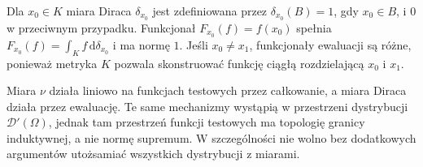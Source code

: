 \begin{przyklad}
\label{ex:dirac12}
Dla $x_0\in K$ miara Diraca $\delta_{x_0}$ jest zdefiniowana
przez $\delta_{x_0}(B)=1$, gdy $x_0\in B$, i $0$ w przeciwnym
przypadku. Funkcjonał $F_{x_0}(f)=f(x_0)$ spełnia
$F_{x_0}(f)=\int_Kf\,\mathrm d\delta_{x_0}$ i ma normę $1$.
Jeśli $x_0\ne x_1$, funkcjonały ewaluacji są różne,
ponieważ metryka $K$ pozwala skonstruować funkcję ciągłą
rozdzielającą $x_0$ i $x_1$.
\end{przyklad}

\begin{uwaga}
\label{rem:bridge-distribution12}
Miara $\nu$ działa liniowo na funkcjach testowych przez całkowanie,
a miara Diraca działa przez ewaluację. Te same mechanizmy wystąpią
w przestrzeni dystrybucji $\mathcal D'(\Omega)$, jednak tam
przestrzeń funkcji testowych ma topologię granicy induktywnej,
a nie normę supremum. W szczególności nie wolno bez dodatkowych
argumentów utożsamiać wszystkich dystrybucji z miarami.
\end{uwaga}
